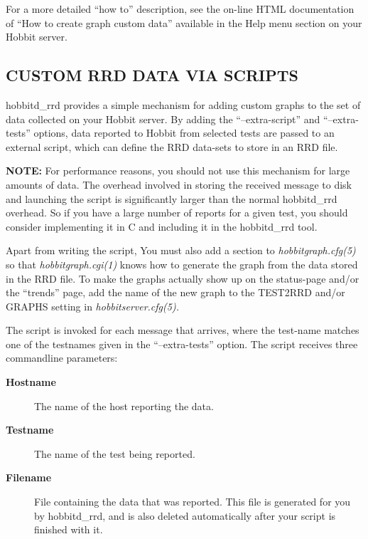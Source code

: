   For a more detailed ``how to'' description, see the on-line HTML documentation of ``How to create graph custom data'' available in the Help menu section on your Hobbit server. 


 


 
\subsection{CUSTOM RRD DATA VIA SCRIPTS}
 hobbitd\_rrd provides a simple mechanism for adding custom graphs to the set of data collected on your Hobbit server. By adding the ``--extra-script'' and ``--extra-tests'' options, data reported to Hobbit from selected tests are passed to an external script, which can define the RRD data-sets to store in an RRD file. 

 \textbf{NOTE:}
 For performance reasons, you should not use this mechanism for large amounts of data. The overhead involved in storing the received message to disk and launching the script is significantly larger than the normal hobbitd\_rrd overhead. So if you have a large number of reports for a given test, you should consider implementing it in C and including it in the hobbitd\_rrd tool. 


  Apart from writing the script, You must also add a section to \emph{hobbitgraph.cfg(5)}
 so that \emph{hobbitgraph.cgi(1)}
 knows how to generate the graph from the data stored in the RRD file. To make the graphs actually show up on the status-page and/or the ``trends'' page, add the name of the new graph to the TEST2RRD and/or GRAPHS setting in \emph{hobbitserver.cfg(5).}



  The script is invoked for each message that arrives, where the test-name matches one of the testnames given in the ``--extra-tests'' option. The script receives three commandline parameters: 


 \begin{description}
\item[\textbf{Hostname}
] The name of the host reporting the data. 
\item[\textbf{Testname}
] The name of the test being reported. 
\item[\textbf{Filename}
] File containing the data that was reported. This file is generated for you by hobbitd\_rrd, and is also deleted automatically after your script is finished with it. 

 


\end{description}



